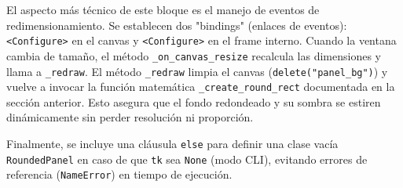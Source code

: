 \documentclass[letterpaper,12pt]{article}
\begin{document}
El aspecto más técnico de este bloque es el manejo de eventos de redimensionamiento. Se establecen dos "bindings" (enlaces de eventos): \texttt{<Configure>} en el canvas y \texttt{<Configure>} en el frame interno. Cuando la ventana cambia de tamaño, el método \texttt{\_on\_canvas\_resize} recalcula las dimensiones y llama a \texttt{\_redraw}. El método \texttt{\_redraw} limpia el canvas (\texttt{delete("panel\_bg")}) y vuelve a invocar la función matemática \texttt{\_create\_round\_rect} documentada en la sección anterior. Esto asegura que el fondo redondeado y su sombra se estiren dinámicamente sin perder resolución ni proporción.

Finalmente, se incluye una cláusula \texttt{else} para definir una clase vacía \texttt{RoundedPanel} en caso de que \texttt{tk} sea \texttt{None} (modo CLI), evitando errores de referencia (\texttt{NameError}) en tiempo de ejecución.
\end{document}
